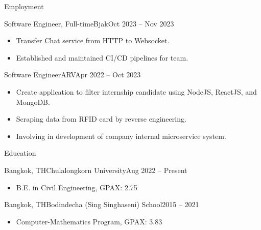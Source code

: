 \documentclass[]{patrickchodev-cv}
\begin{document}
	\makeheader
	
	\begin{cvsection}{Employment}
		\begin{cvsubsection}{Software Engineer, Full-time}{Bjak}{Oct 2023 -- Nov 2023}
			\begin{itemize}
				\item Transfer Chat service from HTTP to Websocket.
				\item Established and maintained CI/CD pipelines for team.
			\end{itemize}
		\end{cvsubsection}
		
		\begin{cvsubsection}{Software Engineer}{ARV}{Apr 2022 -- Oct 2023}	
			\begin{itemize}
				\item Create application to filter internship candidate using NodeJS, ReactJS, and MongoDB.
				\item Scraping data from RFID card by reverse engineering.
				\item Involving in development of company internal microservice system.
			\end{itemize}
		\end{cvsubsection}
	\end{cvsection}
	
	\begin{cvsection}{Education}
		\begin{cvsubsection}{Bangkok, TH}{Chulalongkorn University}{Aug 2022 -- Present}
			\begin{itemize}
				\item B.E. in Civil Engineering, GPAX: 2.75
			\end{itemize}
		\end{cvsubsection}
		\begin{cvsubsection}{Bangkok, TH}{Bodindecha (Sing Singhaseni) School}{2015 -- 2021}
			\begin{itemize}
				\item Computer-Mathematics Program, GPAX: 3.83
			\end{itemize}
		\end{cvsubsection}
	\end{cvsection}
	
\end{document}
